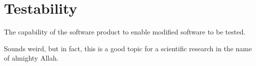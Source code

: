 \section{Testability}
\label{sec:Testability}

The capability of the software product to enable modified software to be tested.

Sounds weird, but in fact, this is a good topic for a scientific research in the name of almighty Allah.